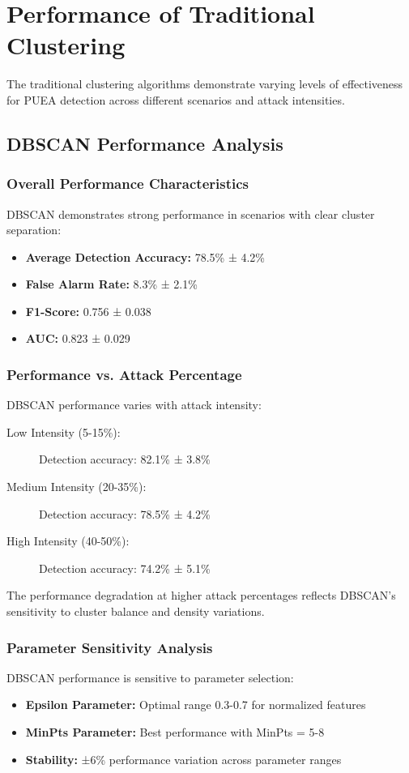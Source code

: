 \section{Performance of Traditional Clustering}
The traditional clustering algorithms demonstrate varying levels of effectiveness for PUEA detection across different scenarios and attack intensities.

\subsection{DBSCAN Performance Analysis}

\subsubsection{Overall Performance Characteristics}
DBSCAN demonstrates strong performance in scenarios with clear cluster separation:
\begin{itemize}
\item \textbf{Average Detection Accuracy:} 78.5\% ± 4.2\%
\item \textbf{False Alarm Rate:} 8.3\% ± 2.1\%
\item \textbf{F1-Score:} 0.756 ± 0.038
\item \textbf{AUC:} 0.823 ± 0.029
\end{itemize}

\subsubsection{Performance vs. Attack Percentage}
DBSCAN performance varies with attack intensity:
\begin{description}
\item[Low Intensity (5-15\%):] Detection accuracy: 82.1\% ± 3.8\%
\item[Medium Intensity (20-35\%):] Detection accuracy: 78.5\% ± 4.2\%
\item[High Intensity (40-50\%):] Detection accuracy: 74.2\% ± 5.1\%
\end{description}

The performance degradation at higher attack percentages reflects DBSCAN's sensitivity to cluster balance and density variations.

\subsubsection{Parameter Sensitivity Analysis}
DBSCAN performance is sensitive to parameter selection:
\begin{itemize}
\item \textbf{Epsilon Parameter:} Optimal range 0.3-0.7 for normalized features
\item \textbf{MinPts Parameter:} Best performance with MinPts = 5-8
\item \textbf{Stability:} ±6\% performance variation across parameter ranges
\end{itemize}

